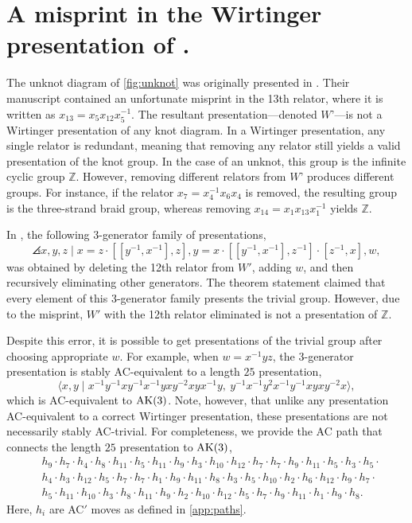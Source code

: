 
\section{A misprint in the Wirtinger presentation of \cite{MMS}.}  \label{app:mms}
The unknot diagram of \cref{fig:unknot} was originally presented in \cite{MMS}. Their manuscript contained an unfortunate misprint in the 13th relator, where it is written as $x_{13}=x_5 x_{12} x_5^{-1}$.  The resultant presentation—denoted $W’$—is not a Wirtinger presentation of any knot diagram. In a Wirtinger presentation, any single relator is redundant, meaning that removing any relator still yields a valid presentation of the knot group. In the case of an unknot, this group is the infinite cyclic group $\mathbb{Z}$. However, removing different relators from $W’$ produces different groups. For instance, if the relator $x_{7} = x_4^{-1} x_{6} x_4$ is removed, the resulting group is the three-strand braid group, whereas removing $x_{14} = x_1 x_{13} x_1^{-1}$ yields $\mathbb{Z}$.

In \cite[Theorem 1.4]{MMS}, the following 3-generator family of presentations,
\[
\angles{ x,y,z \mid  x=z\cdot [[y^{-1},x^{-1}],z], y=x\cdot [[y^{-1},x^{-1}],z^{-1}]\cdot [z^{-1},x], w},
\] 
was obtained by deleting the 12th relator from $W'$, adding $w$, and then recursively eliminating other generators. The theorem statement claimed that every element of this 3-generator family presents the trivial group. However, due to the misprint, $W'$ with the 12th relator eliminated is not a presentation of $\mathbb{Z}$.

Despite this error, it is possible to get presentations of the trivial group after choosing appropriate $w$. For example, when $w = x^{-1} y z$, the 3-generator presentation is stably AC-equivalent to a length $25$ presentation,
\[
\langle x, y \mid
	x^{-1}y^{-1}xy^{-1}x^{-1}yxy^{-2}xyx^{-1}y, \
	y^{-1}x^{-1}y^2x^{-1}y^{-1}xyxy^{-2}x 
\rangle,
\]
which is AC-equivalent to $\text{AK}(3)$. Note, however, that unlike any presentation AC-equivalent to a correct Wirtinger presentation, these presentations are not necessarily stably AC-trivial. For completeness, we provide the AC path that connects the length $25$ presentation to $\text{AK}(3)$,
\[
\begin{aligned}
& h_9 \cdot h_7 \cdot h_4 \cdot h_8 \cdot h_{11} \cdot h_5 \cdot h_{11} \cdot h_9 \cdot h_3 \cdot h_{10} \cdot h_{12} \cdot h_7 \cdot h_7 \cdot h_9 \cdot h_{11} \cdot h_5 \cdot h_3 \cdot h_5 \cdot \\
& h_4 \cdot h_3 \cdot h_{12} \cdot h_5 \cdot h_7 \cdot h_7 \cdot h_1 \cdot h_9 \cdot h_{11} \cdot h_8 \cdot h_3 \cdot h_5 \cdot h_{10} \cdot h_2 \cdot h_6 \cdot h_{12} \cdot h_9 \cdot h_7 \cdot \\
& h_5 \cdot h_{11} \cdot h_{10} \cdot h_3 \cdot h_8 \cdot h_{11} \cdot h_9 \cdot h_2 \cdot h_{10} \cdot h_{12} \cdot h_5 \cdot h_7 \cdot h_9 \cdot h_{11} \cdot h_1 \cdot h_9 \cdot h_8.
\end{aligned}
\]
Here, $h_i$ are AC$'$ moves as defined in \cref{app:paths}. 


